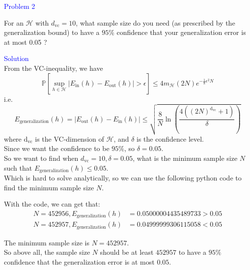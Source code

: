 \textcolor{blue}{Problem 2}

For an $\mathcal{H}$ with $d_{\mathrm{vc}}=10$, what sample size do you need (as prescribed by the generalization bound) to have a $95 \%$ confidence that your generalization error is at most 0.05 ?

\textcolor{blue}{Solution}\\

From the VC-inequality, we have
$$\mathbb{P}\left[\sup_{h\in\mathcal{H}}\left|E_{\text{in}}(h)-E_{\text{out}}(h)\right|>\epsilon\right]\leq 4m_{\mathcal{H}}(2N)e^{-\frac{1}{8}\epsilon^2N}$$
i.e.
$$E_{\text{generalization}}(h) = \left|E_{\text{out}}(h) - E_{\text{in}}(h)\right| \leq \sqrt{\dfrac{8}{N}\ln\left(\dfrac{4((2N)^{\text{d}_{\text{vc}}}+1)}{\delta}\right)}$$
where $\text{d}_{\text{vc}}$ is the VC-dimension of $\mathcal{H}$, and $\delta$ is the confidence level.\\
Since we want the confidence to be $95\%$, so $\delta=0.05$.\\
So we want to find when $d_{\mathrm{vc}}=10, \delta=0.05$, what is the minimum sample size $N$ such that $E_{\text{generalization}}(h)\leq 0.05$.\\
Which is hard to solve analytically, so we can use the following python code to find the minimum sample size $N$.


With the code, we can get that:
\begin{align*}
    N = 452956, E_{\text{generalization}}(h) &= 0.05000004435489733 > 0.05\\
    N = 452957, E_{\text{generalization}}(h) &= 0.04999999306115058 < 0.05
\end{align*}

The minimum sample size is $N=452957$.\\
So above all, the sample size $N$ should be at least $452957$ to have a $95\%$ confidence that the generalization error is at most $0.05$.\\

\newpage
